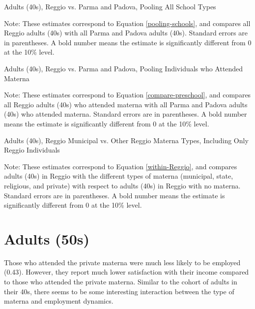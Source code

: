 \documentclass{article}
\begin{document}
\begin{table}[H]
\begin{center}
	\caption{Adults (40s), Reggio vs. Parma and Padova, Pooling All School Types}
	\scalebox{0.9}{
		
		}
\end{center}
\raggedright
\footnotesize
Note: These estimates correspond to Equation \ref{pooling-schools}, and compares all Reggio adults (40s) with all Parma and Padova adults (40s). Standard errors are in parentheses. A bold number means the estimate is significantly different from 0 at the 10\% level. 
\end{table}

\begin{table}[H]
\begin{center}
	\caption{Adults (40s), Reggio vs. Parma and Padova, Pooling Individuals who Attended Materna}
	\scalebox{0.9}{
		
		}
\end{center}
\raggedright
\footnotesize
Note: These estimates correspond to Equation \ref{compare-preschool}, and compares all Reggio adults (40s) who attended materna with all Parma and Padova adults (40s) who attended materna. Standard errors are in parentheses. A bold number means the estimate is significantly different from 0 at the 10\% level. 
\end{table}

\begin{table}[H]
\begin{center}
	\caption{Adults (40s), Reggio Municipal vs. Other Reggio Materna Types, Including Only Reggio Individuals}
		
\end{center}
\raggedright
\footnotesize
Note: These estimates correspond to Equation \ref{within-Reggio}, and compares adults (40s) in Reggio with the different types of materna (municipal, state, religious, and private) with respect to adults (40s) in Reggio with no materna. Standard errors are in parentheses. A bold number means the estimate is significantly different from 0 at the 10\% level. 
\end{table}


\section{Adults (50s)}
Those who attended the private materna were much less likely to be employed (0.43). However, they report much lower satisfaction with their income compared to those who attended the private materna. Similar to the cohort of adults in their 40s, there seems to be some interesting interaction between the type of materna and employment dynamics. 
\end{document}
